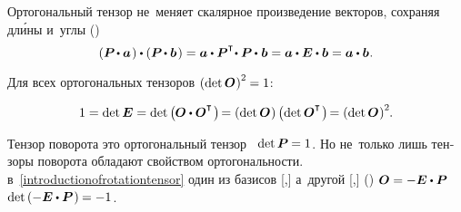 \begin{otherlanguage}{russian}

Ортогональный тензор не~меняет скалярное произведение векторов, сохраняя дл\'{и}ны и~углы ()
\vspace{.1em}\begin{equation}\label{rotationtensorkeepsmetrics}
\left( \bm{P} \hspace{-0.2ex} \dotp \bm{a}\hspace{.2ex} \right) \dotp \left( \bm{P} \hspace{-0.2ex} \dotp \bm{b}\hspace{.2ex} \right) =
\bm{a} \dotp \bm{P}^{\T} \hspace{-0.4ex} \dotp \bm{P} \hspace{-0.1ex} \dotp \hspace{.1ex} \bm{b} = \bm{a} \dotp \bm{E} \dotp \bm{b} = \bm{a} \dotp \bm{b}
\hspace{.1ex} .
\end{equation}

Для всех ортогональных тензоров ${\left(\operatorname{det} \bm{O}\hspace{.1ex}\right)^2 \hspace{-0.1ex} = 1}$:

\nopagebreak\vspace{-0.1em}\begin{equation*}
1 = \operatorname{det} \bm{E} = \operatorname{det} \left({\hspace{-0.1ex} \rotationtensor \dotp \rotationtensor^{\T} \hspace{.2ex}}\right) \hspace{-0.3ex}
= \left({\operatorname{det} \rotationtensor \hspace{.1ex}}\right) \left({\operatorname{det} \rotationtensor^{\T} \hspace{.2ex}}\right) \hspace{-0.3ex}
= \left(\operatorname{det} \rotationtensor \hspace{.1ex} \right)^2
\hspace{-0.1ex} \!.
\end{equation*}

Тензор поворота это ортогональный тензор ~${\operatorname{det} \bm{P} \hspace{-0.1ex} = 1}$.
Но не~только лишь тензоры поворота обладают свойством ортогональности.
 в~\eqref{introductionofrotationtensor} один из базисов [,] а~другой [,]   () ${\rotationtensor = -\bm{E} \dotp \bm{P}}$ ~${\operatorname{det} \left( -\bm{E} \dotp \bm{P} \hspace{.16ex} \right) \hspace{-0.1ex} = -1}$.


\end{otherlanguage}
